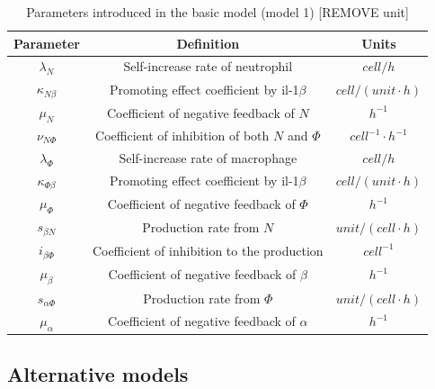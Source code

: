 \begin{table}[h!]
    \centering
    \begin{tabular}{|c c c|}
        \hline
        Parameter            & Definition                                       & Units                    \\ [0.5ex]
        \hline\hline
        $\lambda_N$          & Self-increase rate of neutrophil                 & $cell/h$                 \\
        $\kappa_{N\beta}$    & Promoting effect coefficient by il-1$\beta$      & $cell/(unit\cdotp h)$    \\
        $\mu_N$              & Coefficient of negative feedback of $N$          & $h^{-1}$                 \\
        $\nu_{N\Phi}$        & Coefficient of inhibition of both $N$ and $\Phi$ & $cell^{-1}\cdotp h^{-1}$ \\
        \hline
        $\lambda_\Phi$       & Self-increase rate of macrophage                 & $cell/h$                 \\
        $\kappa_{\Phi\beta}$ & Promoting effect coefficient by il-1$\beta$      & $cell/(unit\cdotp h)$    \\
        $\mu_\Phi$           & Coefficient of negative feedback of $\Phi$       & $h^{-1}$                 \\
        \hline
        $s_{\beta N}$        & Production rate from $N$                         & $unit/(cell\cdotp h)$    \\
        $i_{\beta\Phi}$      & Coefficient of inhibition to the production      & $cell^{-1}$              \\
        $\mu_\beta$          & Coefficient of negative feedback of $\beta$      & $h^{-1}$                 \\
        \hline
        $s_{\alpha\Phi}$     & Production rate from $\Phi$                      & $unit/(cell\cdotp h)$    \\
        $\mu_\alpha$         & Coefficient of negative feedback of $\alpha$     & $h^{-1}$                 \\
        \hline
    \end{tabular}
    \caption{Parameters introduced in the basic model (model 1) [REMOVE unit]}
    \label{table:m1}
\end{table}

\subsection{Alternative models}

